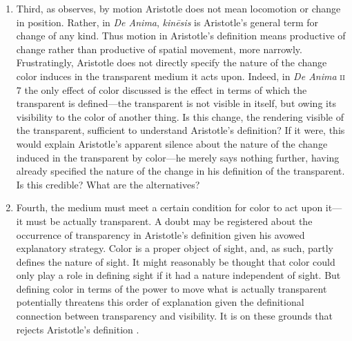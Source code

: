 \begin{enumerate}[(1)]
\item Third, as \citet[367]{Hicks:1907uq} observes, by motion Aristotle does not mean locomotion or change in position. Rather, in \emph{De Anima}, \emph{kin\={e}sis} is Aristotle's general term for change of any kind. Thus motion in Aristotle's definition means productive of change rather than productive of spatial movement, more narrowly. Frustratingly, Aristotle does not directly specify the nature of the change color induces in the transparent medium it acts upon. Indeed, in \emph{De Anima} \textsc{ii} 7 the only effect of color discussed is the effect in terms of which the transparent is defined---the transparent is not visible in itself, but owing its visibility to the color of another thing. Is this change, the rendering visible of the transparent, sufficient to understand Aristotle's definition? If it were, this would explain Aristotle's apparent silence about the nature of the change induced in the transparent by color---he merely says nothing further, having already specified the nature of the change in his definition of the transparent. Is this credible? What are the alternatives?
\item Fourth, the medium must meet a certain condition for color to act upon it---it must be actually transparent. A doubt may be registered about the occurrence of transparency in Aristotle's definition given his avowed explanatory strategy. Color is a proper object of sight, and, as such, partly defines the nature of sight. It might reasonably be thought that color could only play a role in defining sight if it had a nature independent of sight. But defining color in terms of the power to move what is actually transparent potentially threatens this order of explanation given the definitional connection between transparency and visibility. It is on these grounds that \citet{Zabarella:1605kx} rejects Aristotle's definition \citep[see][for discussion]{Broackes:1999uq}.
\end{enumerate}

